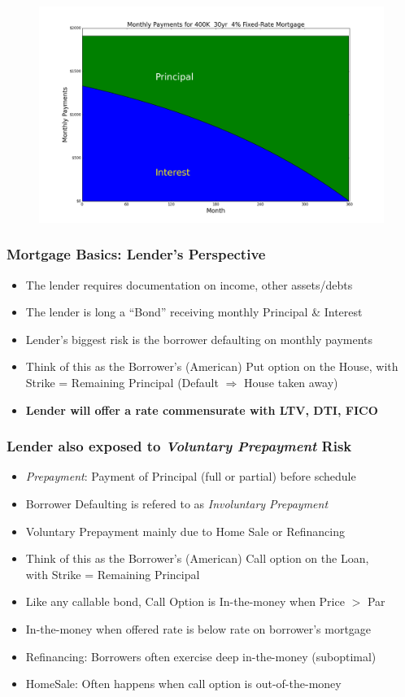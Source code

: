 \documentclass{beamer}
\begin{document}
\begin{frame}
\begin{figure}
\includegraphics[scale=0.32]{monthly_pni.png}
\end{figure}
\end{frame}

\begin{frame}
\frametitle{Mortgage Basics: Lender's Perspective}
\begin{itemize}
\item The lender requires documentation on income, other assets/debts
\item The lender is long a ``Bond'' receiving monthly Principal \& Interest
\item Lender's biggest risk is the borrower defaulting on monthly payments
\item Think of this as the Borrower's (American) Put option on the House, with Strike = Remaining Principal (Default $\Rightarrow$ House taken away)
\item {\bf Lender will offer a rate commensurate with LTV, DTI, FICO}
\end{itemize}
\end{frame}

\begin{frame}
\frametitle{Lender also exposed to {\em Voluntary Prepayment} Risk}
\begin{itemize}
\item {\em Prepayment}: Payment of Principal (full or partial) before schedule
\item Borrower Defaulting is refered to as {\em Involuntary Prepayment}
\item Voluntary Prepayment mainly due to Home Sale or Refinancing
\item Think of this as the Borrower's (American) Call option on the Loan, \\ with Strike = Remaining Principal
\item Like any callable bond, Call Option is In-the-money when Price $>$ Par
\item In-the-money when offered rate is below rate on borrower's mortgage
\item Refinancing: Borrowers often exercise deep in-the-money (suboptimal) 
\item HomeSale: Often happens when call option is out-of-the-money
\end{itemize}
\end{frame}
\end{document}
